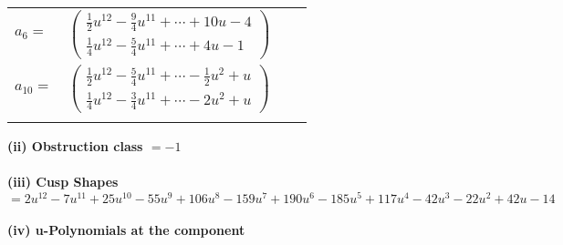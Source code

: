\documentclass[1p]{elsarticle_modified}
\theoremstyle{definition}
\begin{document}
\begin{tabular}{m{7pt} m{180pt} m{7pt} m{180pt} }
\flushright $a_{6}=$&$\begin{pmatrix}\frac{1}{2} u^{12}-\frac{9}{4} u^{11}+\cdots+10 u-4\\\frac{1}{4} u^{12}-\frac{5}{4} u^{11}+\cdots+4 u-1\end{pmatrix}$ \\
\flushright $a_{10}=$&$\begin{pmatrix}\frac{1}{2} u^{12}-\frac{5}{4} u^{11}+\cdots-\frac{1}{2} u^2+u\\\frac{1}{4} u^{12}-\frac{3}{4} u^{11}+\cdots-2 u^2+u\end{pmatrix}$\\&\end{tabular}
\flushleft \textbf{(ii) Obstruction class $= -1$}\\~\\
\flushleft \textbf{(iii) Cusp Shapes $= 2 u^{12}-7 u^{11}+25 u^{10}-55 u^9+106 u^8-159 u^7+190 u^6-185 u^5+117 u^4-42 u^3-22 u^2+42 u-14$}\\~\\
\newpage\renewcommand{\arraystretch}{1}
\flushleft \textbf{(iv) u-Polynomials at the component}\newline \\
\end{document}
